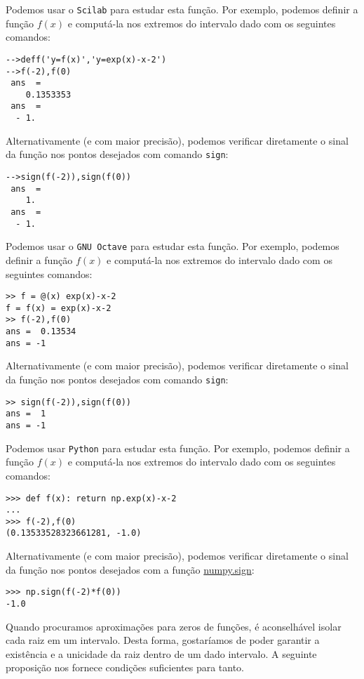 \begin{sol}
\ifisscilab
Podemos usar o \verb+Scilab+ para estudar esta função. Por exemplo, podemos definir a função $f(x)$ e computá-la nos extremos do intervalo dado com os seguintes comandos:
\begin{verbatim}
-->deff('y=f(x)','y=exp(x)-x-2')
-->f(-2),f(0)
 ans  =
    0.1353353
 ans  =
  - 1.
\end{verbatim}
Alternativamente (e com maior precisão), podemos verificar diretamente o sinal da função nos pontos desejados com comando \verb+sign+:
\begin{verbatim}
-->sign(f(-2)),sign(f(0))
 ans  =
    1.
 ans  =
  - 1.
\end{verbatim}
\fi
\ifisoctave
Podemos usar o \verb+GNU Octave+ para estudar esta função. Por exemplo, podemos definir a função $f(x)$ e computá-la nos extremos do intervalo dado com os seguintes comandos:
\begin{verbatim}
>> f = @(x) exp(x)-x-2
f = f(x) = exp(x)-x-2
>> f(-2),f(0)
ans =  0.13534
ans = -1
\end{verbatim}
Alternativamente (e com maior precisão), podemos verificar diretamente o sinal da função nos pontos desejados com comando \verb+sign+:
\begin{verbatim}
>> sign(f(-2)),sign(f(0))
ans =  1
ans = -1
\end{verbatim}
\fi
\ifispython
Podemos usar \verb+Python+ para estudar esta função. Por exemplo, podemos definir a função $f(x)$ e computá-la nos extremos do intervalo dado com os seguintes comandos:
\begin{verbatim}
>>> def f(x): return np.exp(x)-x-2
...
>>> f(-2),f(0)
(0.13533528323661281, -1.0)
\end{verbatim}
Alternativamente (e com maior precisão), podemos verificar diretamente o sinal da função nos pontos desejados com a função \href{https://docs.scipy.org/doc/numpy/reference/generated/numpy.sign.html?highlight=numpy.sign#numpy.sign}{numpy.sign}:
\begin{verbatim}
>>> np.sign(f(-2)*f(0))
-1.0
\end{verbatim}
\fi
\end{sol}


Quando procuramos aproximações para zeros de funções, é aconselhável isolar cada raiz em um intervalo. Desta forma, gostaríamos de poder garantir a existência e a unicidade da raiz dentro de um dado intervalo. A seguinte proposição nos fornece condições suficientes para tanto.

